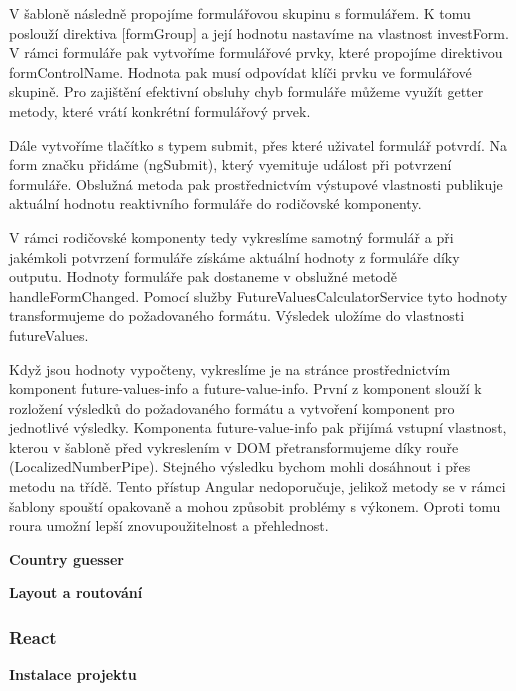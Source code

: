 V šabloně následně propojíme formulářovou skupinu s formulářem. K tomu poslouží direktiva [formGroup] a její hodnotu nastavíme na vlastnost investForm. 
V rámci formuláře pak vytvoříme formulářové prvky, které propojíme direktivou formControlName. Hodnota pak musí odpovídat klíči prvku ve formulářové skupině. 
Pro zajištění efektivní obsluhy chyb formuláře můžeme využít getter metody, které vrátí konkrétní formulářový prvek.

Dále vytvoříme tlačítko s typem submit, přes které uživatel formulář potvrdí. Na form značku přidáme (ngSubmit), který vyemituje událost při potvrzení formuláře. 
Obslužná metoda pak prostřednictvím výstupové vlastnosti publikuje aktuální hodnotu reaktivního formuláře do rodičovské komponenty.

V rámci rodičovské komponenty tedy vykreslíme samotný formulář a při jakémkoli potvrzení formuláře získáme aktuální hodnoty z formuláře díky outputu. 
Hodnoty formuláře pak dostaneme v obslužné metodě handleFormChanged. Pomocí služby FutureValuesCalculatorService tyto hodnoty transformujeme do požadovaného formátu. 
Výsledek uložíme do vlastnosti futureValues. 

Když jsou hodnoty vypočteny, vykreslíme je na stránce prostřednictvím komponent future-values-info a future-value-info. 
První z komponent slouží k rozložení výsledků do požadovaného formátu a vytvoření komponent pro jednotlivé výsledky. 
Komponenta future-value-info pak přijímá vstupní vlastnost, kterou v šabloně před vykreslením v DOM přetransformujeme díky rouře (LocalizedNumberPipe). 
Stejného výsledku bychom mohli dosáhnout i přes metodu na třídě. Tento přístup Angular nedoporučuje, jelikož metody se v rámci šablony spouští opakovaně a mohou způsobit problémy s výkonem. 
Oproti tomu roura umožní lepší znovupoužitelnost a přehlednost.

\begin{flushleft}
  \textbf{Country guesser}
\end{flushleft}

\begin{flushleft}
  \textbf{Layout a routování}
\end{flushleft}

\subsubsection{React}

\begin{flushleft}
  \textbf{Instalace projektu}
\end{flushleft}

